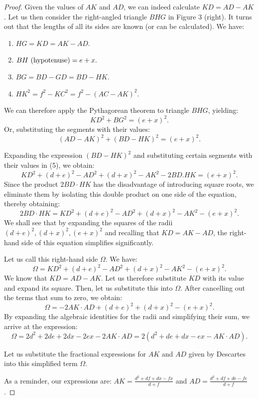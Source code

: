 \documentclass[12pt]{article}
\theoremstyle{définition}
\theoremstyle{remark}
\theoremstyle{plain}
\theoremstyle{plain}
\begin{document}
\begin{proof}

Given the values of $AK$ and $AD$, we can indeed calculate $KD = AD - AK$. Let us then consider the right-angled triangle $BHG$ in Figure 3 (right). It turns out that the lengths of all its sides are known (or can be calculated). We have:
\begin{enumerate}
\item $HG = KD = AK - AD.$
\item $BH\ (\textnormal{hypotenuse}) = e + x.$
\item $BG = BD - GD = BD - HK$.
\item $HK^2 = f^2 - KC^2 = f^2 - (AC-AK)^2$.
\end{enumerate}
We can therefore apply the Pythagorean theorem to triangle $BHG$, yielding:
\[
KD^2 + BG^2 =(e+x)^2.
\]
Or, substituting the segments with their values:
\begin{equation}
(AD - AK)^2 +  (BD - HK)^2 = (e+x)^2.
\end{equation}

Expanding the expression $(BD - HK)^2$ and substituting certain segments with their values in (5), we obtain:
\[
KD^2 + (d+e)^2 - AD^2 + (d+x)^2 - AK^2 - 2BD.HK =(e+x)^2.
\]
Since the product $2BD \cdot HK$ has the disadvantage of introducing square roots, we eliminate them by isolating this double product on one side of the equation, thereby obtaining:
\[
2BD \cdot HK = KD^2 + (d+e)^2 - AD^2 + (d+x)^2 - AK^2 - (e+x)^2.
\]
We shall see that by expanding the squares of the radii $(d+e)^2, (d+x)^2, (e+x)^2$ and recalling that $KD = AK - AD$, the right-hand side of this equation simplifies significantly.

Let us call this right-hand side $\Omega$. We have:
\[
\Omega =KD^{2}+(d+e)^{2}-AD^{2}+(d+x)^{2}-AK^{2}-(e+x)^{2}.
\]
We know that $KD = AD-AK$. Let us therefore substitute $KD$ with its value and expand its square. Then, let us substitute this into $\Omega$. After cancelling out the terms that sum to zero, we obtain:
\[
\Omega = -2AK \cdot AD + (d+e)^2 + (d+x)^2 - (e+x)^2.
\]
By expanding the algebraic identities for the radii and simplifying their sum, we arrive at the expression:
\[
\Omega = 2 d^2 + 2de + 2dx - 2ex -2AK \cdot AD = 2(d^2 + de + dx - ex - AK \cdot AD).
\]

Let us substitute the fractional expressions for \(AK\) and \(AD\) given by Descartes into this simplified term \(\Omega \).

As a reminder, our expressions are: \(AK = \frac{d^2 + df + dx - fx}{d+f}\) and \(AD = \frac{d^2 + df + de - fe}{d+f}\).


\end{proof}
\end{document}
